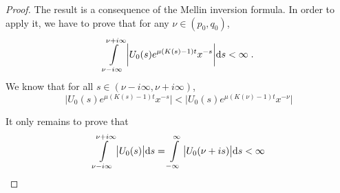 \documentclass[11pt]{amsart}
\begin{document}
    \begin{proof}
    The result is a consequence of the Mellin inversion formula.
    In order to apply it, we have to prove that for any $\nu \in (p_0, q_0)$, 
        \begin{equation*}
            \int\limits_{\nu - i \infty}^{\nu + i \infty} \bigg| U_0(s) e^{\mu(K(s) - 1) t} x^{-s} \bigg| \mathrm ds < \infty
            \; .
        \end{equation*}
    We know that for all $s \in (\nu - i\infty, \nu + i\infty)$, 
        \begin{equation*}
             \bigg| U_0(s) e^{\mu(K(s) - 1) t} x^{-s} \bigg|  <   \bigg| U_0(s)  e^{\mu(K(\nu) - 1) t}  x^{-\nu} \bigg|
        \end{equation*}
    
    It only remains to prove that 
        \begin{equation}
                \int\limits_{\nu - i \infty}^{\nu + i \infty} \big| U_0(s)\big| \mathrm ds 
                = 
                \int\limits_{-\infty}^{\infty} \big| U_0(\nu + is)\big| \mathrm ds
                < \infty
                \label{eq:DouEsc43}
        \end{equation}
    

\end{proof}
\end{document}
